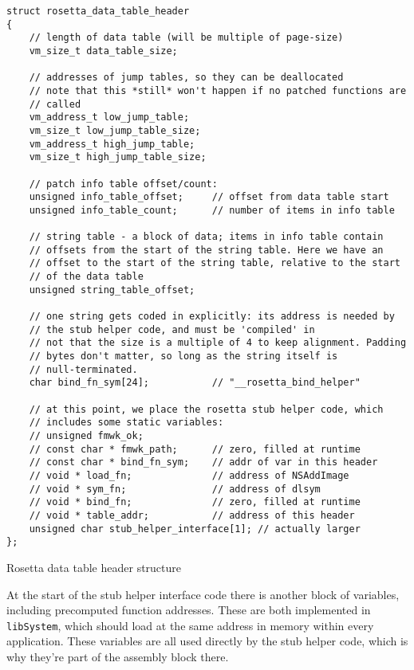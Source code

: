 \documentclass[english]{article}
\begin{document}
\begin{sourcecode}
\begin{verbatim}
struct rosetta_data_table_header
{
    // length of data table (will be multiple of page-size)
    vm_size_t data_table_size;

    // addresses of jump tables, so they can be deallocated
    // note that this *still* won't happen if no patched functions are
    // called
    vm_address_t low_jump_table;
    vm_size_t low_jump_table_size;
    vm_address_t high_jump_table;
    vm_size_t high_jump_table_size;

    // patch info table offset/count:
    unsigned info_table_offset;     // offset from data table start
    unsigned info_table_count;      // number of items in info table

    // string table - a block of data; items in info table contain
    // offsets from the start of the string table. Here we have an
    // offset to the start of the string table, relative to the start
    // of the data table
    unsigned string_table_offset;

    // one string gets coded in explicitly: its address is needed by
    // the stub helper code, and must be 'compiled' in
    // not that the size is a multiple of 4 to keep alignment. Padding
    // bytes don't matter, so long as the string itself is
    // null-terminated.
    char bind_fn_sym[24];           // "__rosetta_bind_helper"

    // at this point, we place the rosetta stub helper code, which
    // includes some static variables:
    // unsigned fmwk_ok;
    // const char * fmwk_path;      // zero, filled at runtime
    // const char * bind_fn_sym;    // addr of var in this header
    // void * load_fn;              // address of NSAddImage
    // void * sym_fn;               // address of dlsym
    // void * bind_fn;              // zero, filled at runtime
    // void * table_addr;           // address of this header
    unsigned char stub_helper_interface[1]; // actually larger
};
\end{verbatim}
\caption{Rosetta data table header structure}
\label{dataTableHeader}
\end{sourcecode}

At the start of the stub helper interface code there is another block of variables, including precomputed function addresses. These are both implemented in \texttt{libSystem}, which should load at the same address in memory within every application. These variables are all used directly by the stub helper code, which is why they're part of the assembly block there.
\end{document}
